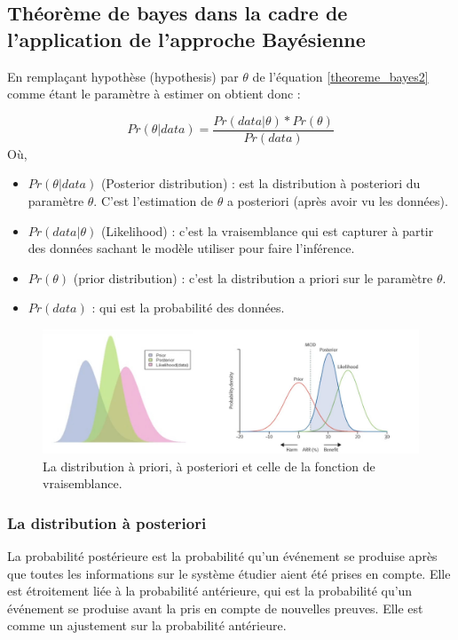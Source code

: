 \subsection{Théorème de bayes dans la cadre de l’application de l’approche Bayésienne}
En remplaçant hypothèse (hypothesis) par \(\displaystyle \theta \) de l’équation \ref{theoreme_bayes2} comme étant le paramètre à estimer on obtient donc :

\begin{equation}
	Pr(\theta|data) = \frac{Pr(data|\theta)*Pr(\theta)}{Pr(data)}
	\label{theoreme_bayes3}
\end{equation}
Où,
\begin{itemize}
    \item \(\displaystyle Pr(\theta|data) \) (Posterior distribution) : est la distribution à posteriori du paramètre \(\displaystyle \theta \). C’est l’estimation de \(\displaystyle \theta \) a posteriori (après avoir vu les données).
    \item \(\displaystyle Pr(data|\theta) \) (Likelihood) : c’est la vraisemblance qui est capturer à partir des données sachant le modèle utiliser pour faire l’inférence.
    \item \(\displaystyle Pr(\theta) \) (prior distribution) : c’est la distribution a priori sur le paramètre \(\displaystyle \theta \). 
    \item \(\displaystyle Pr(data) \) : qui est la probabilité des données.
\end{itemize}


\begin{figure}[H]
	\begin{center}
		\includegraphics[width=\textwidth]{images/chapitre5/prior_likelihood_posterior.png}
	\end{center}
	\caption{La distribution à priori, à posteriori et celle de la fonction de vraisemblance.}
	\label{prior_likelihood_posterior}
\end{figure}

\subsubsection{La distribution à posteriori}
La probabilité postérieure est la probabilité qu'un événement se produise après que toutes les informations sur le système étudier aient été prises en compte. Elle est étroitement liée à la probabilité antérieure, qui est la probabilité qu'un événement se produise avant la pris en compte de nouvelles preuves. Elle est comme un ajustement sur la probabilité antérieure.

